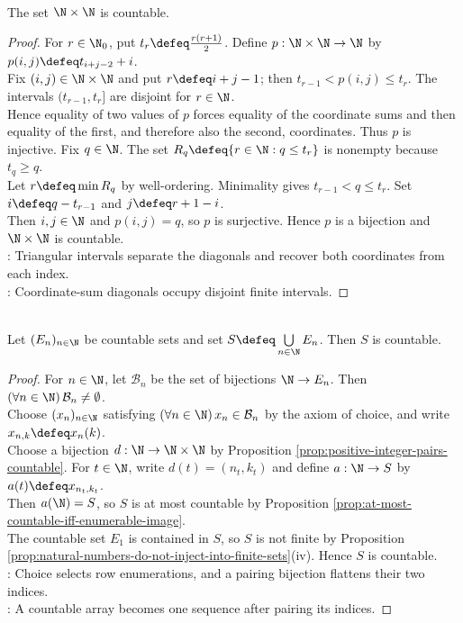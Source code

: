 \begin{proposition} \label{prop:positive-integer-pairs-countable} \\
The set $\N\times\N$ is countable.
\begin{proof}
For $r\in\N_0$, put $t_r\defeq\frac{r(r+1)}{2}$. Define $p:\N\times\N\to\N$ by $p(i,j)\defeq t_{i+j-2}+i$.\\
Fix $(i,j)\in\N\times\N$ and put $r\defeq i+j-1$; then $t_{r-1}<p(i,j)\leq t_r$. The intervals $(t_{r-1},t_r]$ are disjoint for $r\in\N$.\\
Hence equality of two values of $p$ forces equality of the coordinate sums and then equality of the first, and therefore also the second, coordinates. Thus $p$ is injective. Fix $q\in\N$. The set $R_q\defeq\{r\in\N:q\leq t_r\}$ is nonempty because $t_q\geq q$.\\
Let $r\defeq\min R_q$ by well-ordering. Minimality gives $t_{r-1}<q\leq t_r$. Set $i\defeq q-t_{r-1}$ and $j\defeq r+1-i$.\\
Then $i,j\in\N$ and $p(i,j)=q$, so $p$ is surjective. Hence $p$ is a bijection and $\N\times\N$ is countable.\\
: Triangular intervals separate the diagonals and recover both coordinates from each index.\\
: Coordinate-sum diagonals occupy disjoint finite intervals.
\end{proof}
\end{proposition}

\begin{theorem} \label{thm:countable-union-of-countable-sets} \\
Let $(E_n)_{n\in\N}$ be countable sets and set $S\defeq\bigcup\limits_{n\in\N}E_n$. Then $S$ is countable.
\begin{proof}
For $n\in\N$, let $\mathcal{B}_n$ be the set of bijections $\N\to E_n$. Then $(\forall n\in\N)\,\mathcal{B}_n\neq\emptyset$.\\
Choose $(x_n)_{n\in\N}$ satisfying $(\forall n\in\N)\,x_n\in\mathcal{B}_n$ by the axiom of choice, and write $x_{n,k}\defeq x_n(k)$.\\
Choose a bijection $d:\N\to\N\times\N$ by Proposition \ref{prop:positive-integer-pairs-countable}. For $t\in\N$, write $d(t)=(n_t,k_t)$ and define $a:\N\to S$ by $a(t)\defeq x_{n_t,k_t}$.\\
Then $a(\N)=S$, so $S$ is at most countable by Proposition \ref{prop:at-most-countable-iff-enumerable-image}.\\
The countable set $E_1$ is contained in $S$, so $S$ is not finite by Proposition \ref{prop:natural-numbers-do-not-inject-into-finite-sets}(iv). Hence $S$ is countable.\\
: Choice selects row enumerations, and a pairing bijection flattens their two indices.\\
: A countable array becomes one sequence after pairing its indices.
\end{proof}
\end{theorem}

